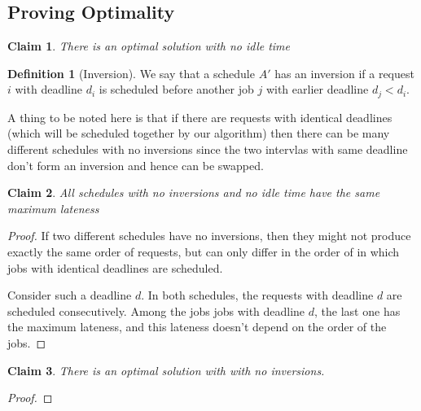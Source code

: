 \documentclass{article}
\newtheorem{claim}{Claim}
\theoremstyle{definition}
\newtheorem{definition}{Definition}
\begin{document}
\subsection{Proving Optimality}

\begin{claim}
There is an optimal solution with no idle time
\end{claim}

\begin{definition}[Inversion]
We say that a schedule $A'$ has an inversion if a request $i$ with 
deadline $d_i$ is scheduled before another job $j$ with earlier deadline
$d_j < d_i$.
\end{definition}

A thing to be noted here is that if there are requests with identical
deadlines (which will be scheduled together by our algorithm) then
there can be many different schedules with no inversions since the two
intervlas with same deadline don't form an inversion and hence can be
swapped.

\begin{claim}
All schedules with no inversions and no idle time have the same maximum
lateness
\end{claim}

\begin{proof}
If two different schedules have no inversions, then they might not 
produce exactly the same order of requests, but can only differ in the
order of in which jobs with identical deadlines are scheduled.

Consider such a deadline $d$. In both schedules, the requests with
deadline $d$ are scheduled consecutively. Among the jobs jobs with
deadline $d$, the last one has the maximum lateness, and this lateness
doesn't depend on the order of the jobs.
\end{proof}

\begin{claim}
There is an optimal solution with with no inversions.
\end{claim}

\begin{proof}
\end{proof}
\end{document}
